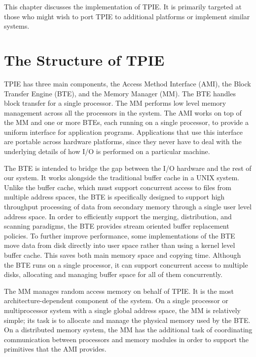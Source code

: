 This chapter discusses the implementation of TPIE.  It is primarily
targeted at those who might wish to port TPIE to additional platforms
or implement similar systems.  

\section{The Structure of TPIE}

TPIE has three main components, the Access Method Interface
(AMI), the Block Transfer Engine
(BTE), and the Memory Manager
(MM).  The BTE handles block transfer for a single
processor.  The MM performs low level memory management across all the
processors in the system.  The AMI works on top of the MM and one or more
BTEs, each running on a single processor, to provide a uniform interface
for application programs.  Applications that use this interface are
portable across hardware platforms, since they never have to deal with the
underlying details of how I/O is performed on a particular machine.

The BTE is intended to bridge the gap between the I/O hardware and the
rest of our system.  It works alongside the traditional buffer
cache in a UNIX system.  Unlike the buffer
cache, which must support concurrent access to
files from multiple address spaces, the BTE is specifically designed
to support high throughput processing of data from secondary memory
through a single user level address space.  In order to efficiently
support the merging, distribution, and scanning paradigms, the BTE
provides stream oriented buffer replacement policies.  To further
improve performance, some implementations of the BTE move data from
disk directly into user space rather than using a kernel level buffer
cache.  This saves both main memory space and
copying time.  Although the BTE runs on a single processor, it can
support concurrent access to multiple disks,
allocating and managing buffer space for all of them concurrently.

The MM manages random access memory on behalf of
TPIE.  It is the most architecture-dependent component of the system.
On a single processor or multiprocessor system with a single global
address space, the MM is relatively simple; its task is to allocate
and manage the physical memory used by the BTE.  On a distributed
memory system, the MM has the additional task of coordinating
communication between processors and memory modules in order to
support the primitives that the AMI provides.

